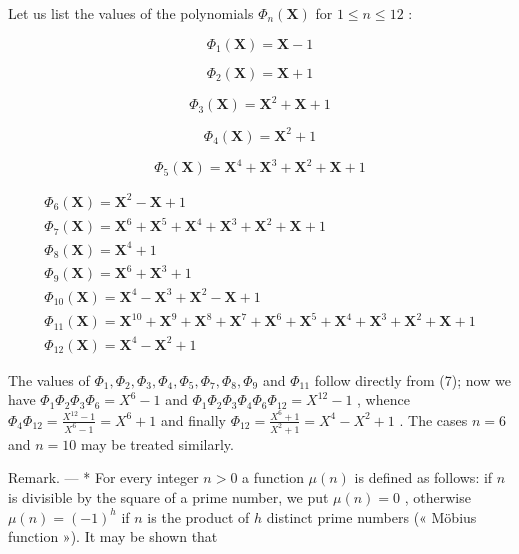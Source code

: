 Let us list the values of the polynomials \(\Phi_n(\mathbf{X})\) for \(1 \leqslant n \leqslant 12\) :

\[
\Phi_ {1} (\mathbf {X}) = \mathbf {X} - 1
\]

\[
\Phi_ {2} (\mathbf {X}) = \mathbf {X} + 1
\]

\[
\Phi_ {3} (\mathbf {X}) = \mathbf {X} ^ {2} + \mathbf {X} + 1
\]

\[
\Phi_ {4} (\mathbf {X}) = \mathbf {X} ^ {2} + 1
\]

\[
\Phi_ {5} (\mathbf {X}) = \mathbf {X} ^ {4} + \mathbf {X} ^ {3} + \mathbf {X} ^ {2} + \mathbf {X} + 1
\]

\[
\begin{array}{l} \Phi_ {6} (\mathbf {X}) = \mathbf {X} ^ {2} - \mathbf {X} + 1 \\ \Phi_ {7} (\mathbf {X}) = \mathbf {X} ^ {6} + \mathbf {X} ^ {5} + \mathbf {X} ^ {4} + \mathbf {X} ^ {3} + \mathbf {X} ^ {2} + \mathbf {X} + 1 \\ \Phi_ {8} (\mathbf {X}) = \mathbf {X} ^ {4} + 1 \\ \Phi_ {9} (\mathbf {X}) = \mathbf {X} ^ {6} + \mathbf {X} ^ {3} + 1 \\ \Phi_ {1 0} (\mathbf {X}) = \mathbf {X} ^ {4} - \mathbf {X} ^ {3} + \mathbf {X} ^ {2} - \mathbf {X} + 1 \\ \Phi_ {1 1} (\mathbf {X}) = \mathbf {X} ^ {1 0} + \mathbf {X} ^ {9} + \mathbf {X} ^ {8} + \mathbf {X} ^ {7} + \mathbf {X} ^ {6} + \mathbf {X} ^ {5} + \mathbf {X} ^ {4} + \mathbf {X} ^ {3} + \mathbf {X} ^ {2} + \mathbf {X} + 1 \\ \Phi_ {1 2} (\mathbf {X}) = \mathbf {X} ^ {4} - \mathbf {X} ^ {2} + 1 \end{array}
\]

The values of \(\Phi_1, \Phi_2, \Phi_3, \Phi_4, \Phi_5, \Phi_7, \Phi_8, \Phi_9\) and \(\Phi_{11}\) follow directly from (7); now we have \(\Phi_1\Phi_2\Phi_3\Phi_6 = X^6 - 1\) and \(\Phi_1\Phi_2\Phi_3\Phi_4\Phi_6\Phi_{12} = X^{12} - 1\) , whence \(\Phi_4\Phi_{12} = \frac{X^{12} - 1}{X^6 - 1} = X^6 + 1\) and finally \(\Phi_{12} = \frac{X^6 + 1}{X^2 + 1} = X^4 - X^2 + 1\) . The cases \(n = 6\) and \(n = 10\) may be treated similarly.

Remark. --- * For every integer \(n>0\) a function \(\mu(n)\) is defined as follows: if \(n\) is divisible by the square of a prime number, we put \(\mu(n)=0\) , otherwise \(\mu(n)=(-1)^{h}\) if \(n\) is the product of \(h\) distinct prime numbers (« Möbius function »). It may be shown that

